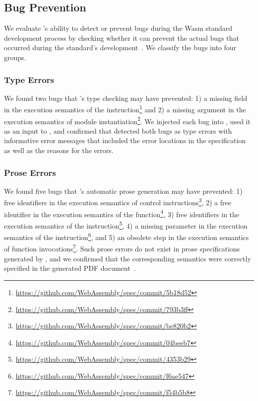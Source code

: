 \subsection{Bug Prevention}\label{sec:bug}
We evaluate \dslname's ability to detect or prevent bugs
during the Wasm standard development process
by checking whether it can prevent
the actual bugs that occurred during the standard's development~\cite{wasmspecrepo}.
We classify the bugs into four groups.

\subsubsection*{Type Errors}
We found two bugs that \dslname's type checking may have prevented:
1) a missing field in the execution semantics of the 
instruction\footnote{\url{https://github.com/WebAssembly/spec/commit/5b18d52}} and
2) a missing argument in the execution semantics of module
instantiation\footnote{\url{https://github.com/WebAssembly/spec/commit/793b3ff}}.
We injected each bug into \specdsl, used it as an input to \dslname,
and confirmed that \dslname detected both bugs as type errors with
informative error messages that included the error locations in the specification
as well as the reasons for the errors.

\subsubsection*{Prose Errors}
We found five bugs that \dslname's automatic prose generation may have prevented:
1) free identifiers in the execution semantics of control
instructions\footnote{\url{https://github.com/WebAssembly/spec/commit/be820b2}},
2) a free identifier in the execution semantics of the 
function\footnote{\url{https://github.com/WebAssembly/spec/commit/04beeb7}},
3) free identifiers in the execution semantics of the 
instruction\footnote{\url{https://github.com/WebAssembly/spec/commit/4353b29}},
4) a missing parameter in the execution semantics of the 
instruction\footnote{\url{https://github.com/WebAssembly/spec/commit/f6ae547}}, and
5) an obsolete step in the execution semantics of function
invocations\footnote{\url{https://github.com/WebAssembly/spec/commit/f54b5b8}}.
Such prose errors do not exist in prose specifications
generated by \dslname, and we confirmed that the corresponding semantics
were correctly specified in the generated PDF document~\cite{specdsl}.

